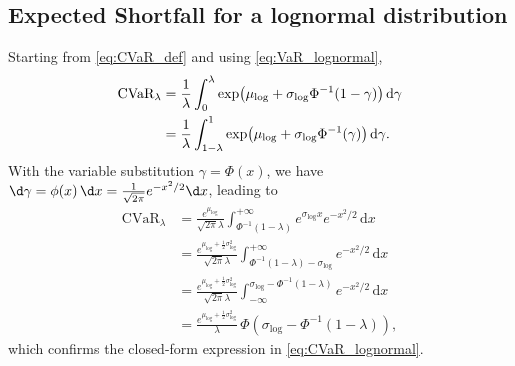 \subsection{Expected Shortfall for a lognormal distribution} \label{sec:appendix-es}


Starting from \eqref{eq:CVaR_def} and using \eqref{eq:VaR_lognormal},
\begin{align}
\text{CVaR}_\lambda
%
&= \frac{1}{\lambda}\int_0^{\lambda}\exp\!\big(\mu_{\text{log}} + \sigma_{\text{log}}\Phi^{-1}(1-\gamma)\big)\,\mathrm{d}\gamma\notag\\
%
 &= \frac{1}{\lambda}\int_{1-\lambda}^{1} 
     \exp\!\big(\mu_{\text{log}} + \sigma_{\text{log}}\Phi^{-1}(\gamma)\big)\, \mathrm{d}\gamma.
\end{align}
With the variable substitution $ \gamma = \Phi(x)$, 
we have $ \d\gamma = \phi(x)\,\d x = \frac{1}{\sqrt{2\pi}} e^{-x^2/2}\d x$, leading to
\begin{align}
\text{CVaR}_\lambda
 &= \frac{e^{\mu_{\text{log}}}}{\sqrt{2\pi}\lambda}
    \int_{\Phi^{-1}(1-\lambda)}^{+\infty}
       e^{\sigma_{\text{log}}x}e^{-x^2/2}\,\mathrm{d}x  \\[3pt]
 &= \frac{e^{\mu_{\text{log}}+\frac{1}{2}\sigma_{\text{log}}^2}}{\sqrt{2\pi}\lambda}
    \int_{\Phi^{-1}(1-\lambda)-\sigma_{\text{log}}}^{+\infty}
       e^{-x^2/2}\,\mathrm{d}x \\[3pt]
        &= \frac{e^{\mu_{\text{log}}+\frac{1}{2}\sigma_{\text{log}}^2}}{\sqrt{2\pi}\lambda}
    \int^{\sigma_{\text{log}}-\Phi^{-1}(1-\lambda)}_{-\infty}
       e^{-x^2/2}\,\mathrm{d}x \\[3pt]
 &= \frac{e^{\mu_{\text{log}}+\frac{1}{2}\sigma_{\text{log}}^2}}{\lambda}
    \,\Phi\!\left(\sigma_{\text{log}}-\Phi^{-1}(1-\lambda)\right),
\end{align}
which confirms the closed-form expression in \eqref{eq:CVaR_lognormal}.





